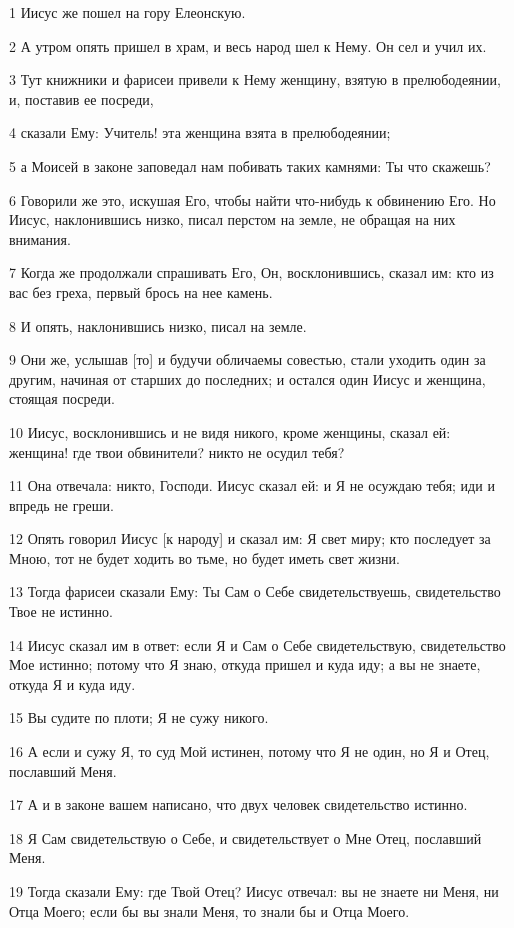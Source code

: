 \par 1 Иисус же пошел на гору Елеонскую.
\par 2 А утром опять пришел в храм, и весь народ шел к Нему. Он сел и учил их.
\par 3 Тут книжники и фарисеи привели к Нему женщину, взятую в прелюбодеянии, и, поставив ее посреди,
\par 4 сказали Ему: Учитель! эта женщина взята в прелюбодеянии;
\par 5 а Моисей в законе заповедал нам побивать таких камнями: Ты что скажешь?
\par 6 Говорили же это, искушая Его, чтобы найти что-нибудь к обвинению Его. Но Иисус, наклонившись низко, писал перстом на земле, не обращая на них внимания.
\par 7 Когда же продолжали спрашивать Его, Он, восклонившись, сказал им: кто из вас без греха, первый брось на нее камень.
\par 8 И опять, наклонившись низко, писал на земле.
\par 9 Они же, услышав [то] и будучи обличаемы совестью, стали уходить один за другим, начиная от старших до последних; и остался один Иисус и женщина, стоящая посреди.
\par 10 Иисус, восклонившись и не видя никого, кроме женщины, сказал ей: женщина! где твои обвинители? никто не осудил тебя?
\par 11 Она отвечала: никто, Господи. Иисус сказал ей: и Я не осуждаю тебя; иди и впредь не греши.
\par 12 Опять говорил Иисус [к народу] и сказал им: Я свет миру; кто последует за Мною, тот не будет ходить во тьме, но будет иметь свет жизни.
\par 13 Тогда фарисеи сказали Ему: Ты Сам о Себе свидетельствуешь, свидетельство Твое не истинно.
\par 14 Иисус сказал им в ответ: если Я и Сам о Себе свидетельствую, свидетельство Мое истинно; потому что Я знаю, откуда пришел и куда иду; а вы не знаете, откуда Я и куда иду.
\par 15 Вы судите по плоти; Я не сужу никого.
\par 16 А если и сужу Я, то суд Мой истинен, потому что Я не один, но Я и Отец, пославший Меня.
\par 17 А и в законе вашем написано, что двух человек свидетельство истинно.
\par 18 Я Сам свидетельствую о Себе, и свидетельствует о Мне Отец, пославший Меня.
\par 19 Тогда сказали Ему: где Твой Отец? Иисус отвечал: вы не знаете ни Меня, ни Отца Моего; если бы вы знали Меня, то знали бы и Отца Моего.
